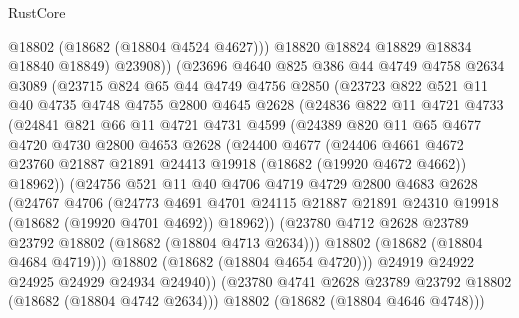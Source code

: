 \begin{lexlean}{RustCore}
\begin{coremodule}
              @18802
              (@18682 (@18804 @4524 @4627)))
            @18820
            @18824
            @18829
            @18834
            @18840
            @18849)
          @23908))
      (@23696
        @4640
        @825
        @386
        @44
        @4749
        @4758
        @2634
        @3089
        (@23715
          @824
          @65
          @44
          @4749
          @4756
          @2850
          (@23723
            @822
            @521
            @11
            @40
            @4735
            @4748
            @4755
            @2800
            @4645
            @2628
            (@24836
              @822
              @11
              @4721
              @4733
              (@24841
                @821
                @66
                @11
                @4721
                @4731
                @4599
                (@24389
                  @820
                  @11
                  @65
                  @4677
                  @4720
                  @4730
                  @2800
                  @4653
                  @2628
                  (@24400
                    @4677
                    (@24406
                      @4661
                      @4672
                      @23760
                      @21887
                      @21891
                      @24413
                      @19918
                      (@18682 (@19920 @4672 @4662))
                      @18962))
                  (@24756
                    @521
                    @11
                    @40
                    @4706
                    @4719
                    @4729
                    @2800
                    @4683
                    @2628
                    (@24767
                      @4706
                      (@24773
                        @4691
                        @4701
                        @24115
                        @21887
                        @21891
                        @24310
                        @19918
                        (@18682 (@19920 @4701 @4692))
                        @18962))
                    (@23780 @4712 @2628 @23789 @23792 @18802 (@18682 (@18804 @4713 @2634)))
                    @18802
                    (@18682 (@18804 @4684 @4719)))
                  @18802
                  (@18682 (@18804 @4654 @4720)))
                @24919
                @24922
                @24925
                @24929
                @24934
                @24940))
            (@23780 @4741 @2628 @23789 @23792 @18802 (@18682 (@18804 @4742 @2634)))
            @18802
            (@18682 (@18804 @4646 @4748)))

\end{coremodule}
\end{lexlean}
